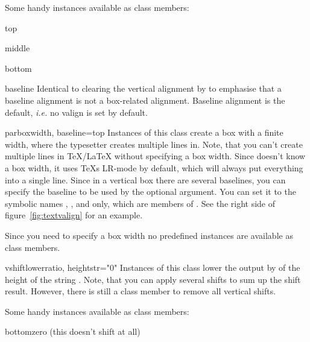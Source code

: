 Some handy instances available as class members:

\begin{memberdesc}{top}
\end{memberdesc}

\begin{memberdesc}{middle}
\end{memberdesc}

\begin{memberdesc}{bottom}
\end{memberdesc}

\begin{memberdesc}{baseline}
  Identical to clearing the vertical alignment by  to
  emphasise that a baseline alignment is not a box-related alignment.
  Baseline alignment is the default, \emph{i.e.} no valign is set by
  default.
\end{memberdesc}

\begin{classdesc}{parbox}{width, baseline=top}
  Instances of this class create a box with a finite width, where the
  typesetter creates multiple lines in. Note, that you can't create
  multiple lines in \TeX/\LaTeX{} without specifying a box width.
  Since \PyX{} doesn't know a box width, it uses \TeX{}s LR-mode by
  default, which will always put everything into a single line. Since
  in a vertical box there are several baselines, you can specify the
  baseline to be used by the optional  argument. You can
  set it to the symbolic names , ,
  and  only, which are members of
  . See the right side of figure~\ref{fig:textvalign}
  for an example.
\end{classdesc}

Since you need to specify a box width no predefined instances are
available as class members.

\begin{classdesc}{vshift}{lowerratio, heightstr="0"}
  Instances of this class lower the output by  of the
  height of the string . Note, that you can apply
  several shifts to sum up the shift result. However, there is still a
   class member to remove all vertical shifts.
\end{classdesc}

Some handy instances available as class members:

\begin{memberdesc}{bottomzero}
   (this doesn't shift at all)
\end{memberdesc}

